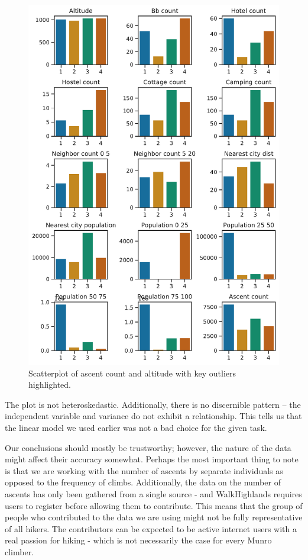 \documentclass[11pt,a4paper]{article}
\begin{document}
\begin{figure} [h!]
  \centering
  \includegraphics{report/munro_features.pdf}
  \caption{Scatterplot of ascent count and altitude with key outliers highlighted.}
  \label{fds-project-template:fig:scatterplot}
\end{figure}

\medskip 

The plot is not heteroskedastic. Additionally, there is no discernible pattern – the independent variable and variance do not exhibit a relationship. This tells us that the linear model we used earlier was not a bad choice for the given task.

\medskip 

Our conclusions should mostly be trustworthy; however, the nature of the data might affect their accuracy somewhat. Perhaps the most important thing to note is that we are working with the number of ascents by separate individuals as opposed to the frequency of climbs. Additionally, the data on the number of ascents has only been gathered from a single source - and WalkHighlands requires users to register before allowing them to contribute. This means that the group of people who contributed to the data we are using might not be fully representative of all hikers. The contributors can be expected to be active internet users with a real passion for hiking - which is not necessarily the case for every Munro climber.
\end{document}
